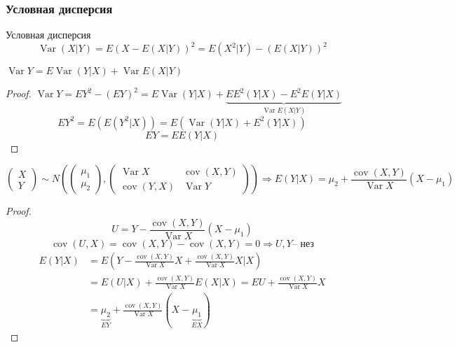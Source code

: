\documentclass{article}
\DeclareMathOperator{\Var}{Var}
\DeclareMathOperator{\cov}{cov}
\begin{document}
    \subsubsection{Условная дисперсия}
    \begin{definition}{Условная дисперсия}
        $$ \Var (X|Y) = E(X-E(X|Y))^2 = E(X^2|Y) - (E(X|Y))^2$$
    \end{definition}
    \begin{property}
        $\Var Y = E\Var (Y|X) + \Var E(X|Y)$
        \begin{proof}
            $\Var Y = EY^2 - (EY)^2 = E\Var(Y|X) + \underbrace{EE^2(Y|X) - E^2E(Y|X)}_{\Var E(X|Y)}$
            $$ EY^2 = E(E(Y^2|X))=E(\Var (Y|X) + E^2(Y|X))$$
            $$ EY = EE(Y|X)$$
        \end{proof}
    \end{property}
    \begin{example}
        $$\begin{pmatrix}
            X \\ Y
        \end{pmatrix} \sim N(\begin{pmatrix}
            \mu_1 \\ \mu_2
        \end{pmatrix}, \begin{pmatrix}
        \Var X & \cov(X, Y)\\
        \cov(Y, X) & \Var Y
        \end{pmatrix}) \Rightarrow E(Y|X) = \mu_2 + \frac{\cov(X, Y)}{\Var X} (X - \mu_1)$$
        \begin{proof}
            $$ U = Y -  \frac{\cov(X, Y)}{\Var X} (X - \mu_1)$$
            $$ \cov(U, X) = \cov(X, Y) - \cov(X, Y) = 0 \Rightarrow U, Y \text{-- нез}$$
            \begin{align*}
            E(Y|X) &= E( Y -  \frac{\cov(X, Y)}{\Var X} X +  \frac{\cov(X, Y)}{\Var X} X| X)\\ &= E(U|X) +  \frac{\cov(X, Y)}{\Var X} E(X|X) = EU + \frac{\cov(X, Y)}{\Var X} X\\ &= \underbrace{\mu_2}_{EY} + \frac{\cov(X, Y)}{\Var X} (X - \underbrace{\mu_1}_{EX})
            \end{align*}
        \end{proof}
    \end{example}
\end{document}
